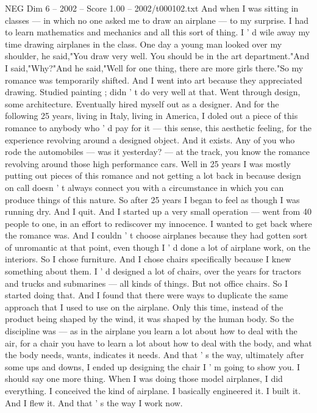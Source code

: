 \begin{textsample}{NEG Dim 6 – 2002 – Score 1.00 – 2002/t000102.txt}
And when I was sitting in classes — in which no one asked me to draw an airplane — to my surprise.
I had to learn mathematics and mechanics and all this sort of thing.
I ' d wile away my time drawing airplanes in the class.
One day a young man looked over my shoulder, he said,"You draw very well.
You should be in the art department."And I said,"Why?"And he said,"Well for one thing, there are more girls there."So my romance was temporarily shifted.
And I went into art because they appreciated drawing.
Studied painting ; didn ' t do very well at that.
Went through design, some architecture.
Eventually hired myself out as a designer.
And for the following 25 years, living in Italy, living in America, I doled out a piece of this romance to anybody who ' d pay for it — this sense, this aesthetic feeling, for the experience revolving around a designed object.
And it exists.
Any of you who rode the automobiles — was it yesterday? — at the track, you know the romance revolving around those high performance cars.
Well in 25 years I was mostly putting out pieces of this romance and not getting a lot back in because design on call doesn ' t always connect you with a circumstance in which you can produce things of this nature.
So after 25 years I began to feel as though I was running dry.
And I quit.
And I started up a very small operation — went from 40 people to one, in an effort to rediscover my innocence.
I wanted to get back where the romance was.
And I couldn ' t choose airplanes because they had gotten sort of unromantic at that point, even though I ' d done a lot of airplane work, on the interiors.
So I chose furniture.
And I chose chairs specifically because I knew something about them.
I ' d designed a lot of chairs, over the years for tractors and trucks and submarines — all kinds of things.
But not office chairs.
So I started doing that.
And I found that there were ways to duplicate the same approach that I used to use on the airplane.
Only this time, instead of the product being shaped by the wind, it was shaped by the human body.
So the discipline was — as in the airplane you learn a lot about how to deal with the air, for a chair you have to learn a lot about how to deal with the body, and what the body needs, wants, indicates it needs.
And that ' s the way, ultimately after some ups and downs, I ended up designing the chair I ' m going to show you.
I should say one more thing.
When I was doing those model airplanes, I did everything.
I conceived the kind of airplane.
I basically engineered it.
I built it.
And I flew it.
And that ' s the way I work now.

\end{textsample}
